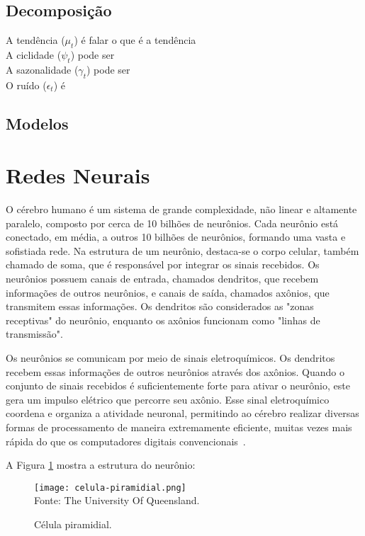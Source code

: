    \subsection{Decomposição}

        A tendência ($\mu_t$) é falar o que é a tendência \\
        
        A ciclidade ($\psi_t$) pode ser \\
        
        A sazonalidade ($\gamma_t$) pode ser \\
        
        O ruído ($\epsilon_t$) é 


    \subsection{Modelos}


\section{Redes Neurais}
    O cérebro humano é um sistema de grande complexidade, não linear e altamente paralelo, composto por cerca de 
    10 bilhões de neurônios. Cada neurônio está conectado, em média, a outros 10 bilhões de neurônios, formando uma 
    vasta e sofistiada rede. Na estrutura de um neurônio, destaca-se o corpo celular, também chamado de soma, que é 
    responsável por integrar os sinais recebidos. Os neurônios possuem canais de entrada, chamados dendritos, que 
    recebem informações de outros neurônios, e canais de saída, chamados axônios, que transmitem essas informações. 
    Os dendritos são considerados as "zonas receptivas" do neurônio, enquanto os axônios funcionam como 
    "linhas de transmissão".

    Os neurônios se comunicam por meio de sinais eletroquímicos. Os dendritos recebem essas informações de outros 
    neurônios através dos axônios. Quando o conjunto de sinais recebidos é suficientemente forte para ativar o 
    neurônio, este gera um impulso elétrico que percorre seu axônio. Esse sinal eletroquímico coordena e organiza a 
    atividade neuronal, permitindo ao cérebro realizar diversas formas de processamento de maneira extremamente 
    eficiente, muitas vezes mais rápida do que os computadores digitais convencionais~\cite{haykin2009neural}.

    A Figura \ref{fig:celula_piramidial} mostra a estrutura do neurônio:
    \begin{figure}[!htb]
        \centering
        \caption{Célula piramidial.}
        \texttt{[image: celula-piramidial.png]}\\
        {\footnotesize Fonte: The University Of Queensland.}\
        \label{fig:celula_piramidial}
    \end{figure}
        
